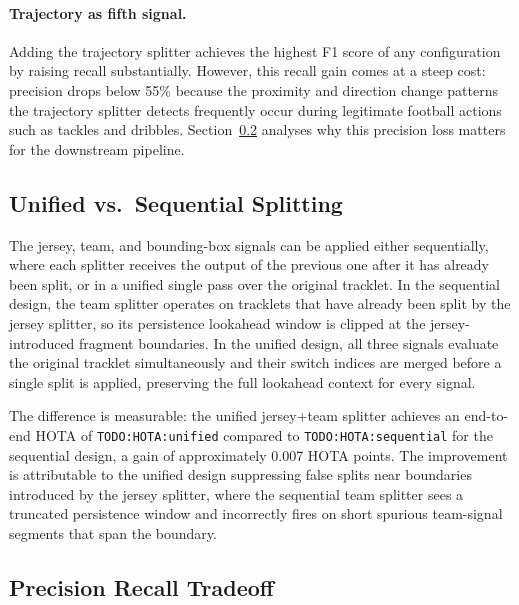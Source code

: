 \paragraph{Trajectory as fifth signal.}
Adding the trajectory splitter achieves the highest F1 score of any configuration by raising recall substantially. However, this recall gain comes at a steep cost: precision drops below 55\% because the proximity and direction change patterns the trajectory splitter detects frequently occur during legitimate football actions such as tackles and dribbles. Section~\ref{sec:precision_recall_tradeoff} analyses why this precision loss matters for the downstream pipeline.

\subsection{Unified vs.\ Sequential Splitting}\label{subsec:unified_vs_sequential}

The jersey, team, and bounding-box signals can be applied either sequentially, where each splitter receives the output of the previous one after it has already been split, or in a unified single pass over the original tracklet. In the sequential design, the team splitter operates on tracklets that have already been split by the jersey splitter, so its persistence lookahead window is clipped at the jersey-introduced fragment boundaries. In the unified design, all three signals evaluate the original tracklet simultaneously and their switch indices are merged before a single split is applied, preserving the full lookahead context for every signal.

The difference is measurable: the unified jersey+team splitter achieves an end-to-end HOTA of \texttt{TODO:HOTA:unified} compared to \texttt{TODO:HOTA:sequential} for the sequential design, a gain of approximately 0.007 HOTA points. The improvement is attributable to the unified design suppressing false splits near boundaries introduced by the jersey splitter, where the sequential team splitter sees a truncated persistence window and incorrectly fires on short spurious team-signal segments that span the boundary.

\subsection{Precision Recall Tradeoff}\label{sec:precision_recall_tradeoff}

